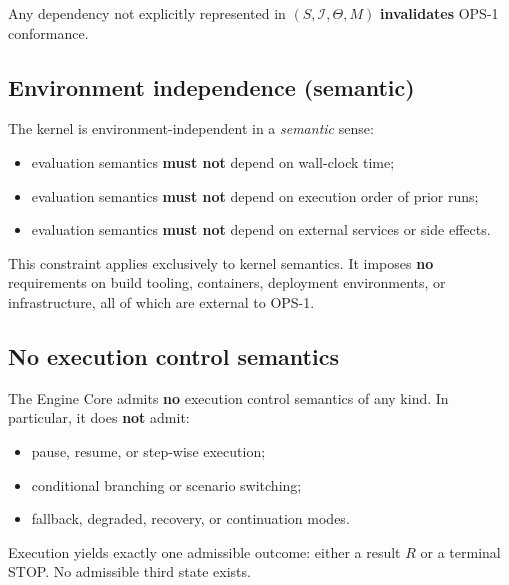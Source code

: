 Any dependency not explicitly represented in
$(S,\mathcal{I},\Theta,M)$ \textbf{invalidates}
OPS-1 conformance.

\subsection{Environment independence (semantic)}

The kernel is environment-independent
in a \emph{semantic} sense:
\begin{itemize}
  \item evaluation semantics \textbf{must not}
        depend on wall-clock time;
  \item evaluation semantics \textbf{must not}
        depend on execution order of prior runs;
  \item evaluation semantics \textbf{must not}
        depend on external services or side effects.
\end{itemize}

This constraint applies exclusively to kernel semantics.
It imposes \textbf{no} requirements on build tooling,
containers, deployment environments, or infrastructure,
all of which are external to OPS-1.

\subsection{No execution control semantics}

The Engine Core admits \textbf{no} execution control
semantics of any kind.
In particular, it does \textbf{not} admit:
\begin{itemize}
  \item pause, resume, or step-wise execution;
  \item conditional branching or scenario switching;
  \item fallback, degraded, recovery,
        or continuation modes.
\end{itemize}

Execution yields exactly one admissible outcome:
either a result $R$ or a terminal STOP.
No admissible third state exists.
